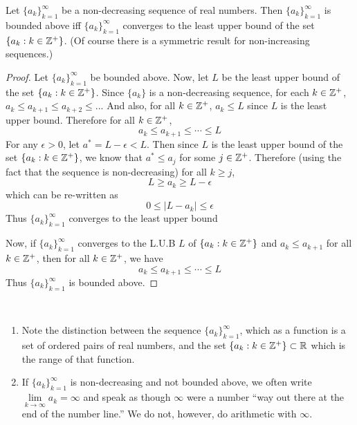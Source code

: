 \begin{pblm}%
	Let $\{a_k\}_{k = 1}^\infty$ be a non-decreasing sequence of real numbers. Then 
	$\{a_k\}_{k = 1}^\infty$ is bounded above iff $\{a_k\}_{k = 1}^\infty$ converges
	to the least upper bound of the set $\{a_k : k \in \mathbb{Z}^+\}$. (Of course 
	there is a symmetric result for non-increasing sequences.)
\begin{proof}
	Let $\{a_k\}_{k=1}^\infty$ be bounded above. Now, let $L$ be the least upper bound of 
	the set $\{a_k: k \in \mathbb{Z}^+\}$. Since $\{a_k\}$ is a non-decreasing sequence, 
	for each $ k \in \mathbb{Z}^+$, $a_k \le a_{k + 1} \le a_{k + 2} \le ... $ 
	And also, for all $k \in \mathbb{Z}^+$, $a_k \le L$ since $L$ is the least upper bound. 
	Therefore for all $k \in \mathbb{Z}^+$, 
	\begin{equation*}
		a_k \le a_{k + 1} \le \cdots \le L
	\end{equation*}
	For any $\epsilon > 0$, let $a^\ast = L - \epsilon < L$. Then since $L$ is the least 
	upper bound of the set $\{a_k: k \in \mathbb{Z}^+\}$, we know that $a^\ast \le a_j$ for 
	some $j \in \mathbb{Z}^+$. Therefore (using the fact that the sequence is 
	non-decreasing) for all $k \ge j$, 
	\begin{equation*}
		L \ge a_k \ge L - \epsilon 
	\end{equation*}
	which can be re-written as 
	\begin{equation*}
		0 \le |L - a_k| \le \epsilon
	\end{equation*}
	Thus $\{a_k\}_{k=1}^\infty$ converges to the least upper bound 
	

	Now, if $\{a_k\}_{k=1}^\infty$ converges to the L.U.B $L$ of $\{a_k:k\in\mathbb{Z}^+\}$
	and $a_k \le a_{k+1}$ for all $k \in \mathbb{Z}^+$, then for all $k \in \mathbb{Z}^+$, 
	we have 
	\begin{equation*}
		a_k \le a_{k + 1} \le \cdots \le L 
	\end{equation*}
	Thus $\{a_k\}_{k = 1}^\infty$ is bounded above. 
\end{proof}
\end{pblm}

\pagebreak
\begin{rmk}%
~
\begin{enumerate}
	\item Note the distinction between the sequence $\{a_k\}_{k = 1}^\infty$, which 
	as a function is a set of ordered pairs of real numbers, and the set 
	$\{a_k: k \in \mathbb{Z}^+\} \subset \mathbb{R}$ which is the range of that 
	function. 
	\item If $\{a_k\}_{k = 1}^\infty$ is non-decreasing and not bounded above, 
	we often write $\lim\limits_{k\to\infty} a_k = \infty$ and speak as though 
	$\infty$ were a number ``way out there at the end of the number line.'' We do 
	not, however, do arithmetic with $\infty$. 
\end{enumerate}
\end{rmk}

